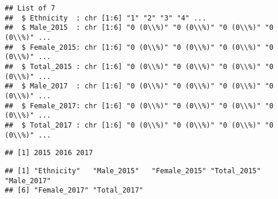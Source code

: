 \documentclass[
]{article}
\begin{document}
\begin{verbatim}
## List of 7
##  $ Ethnicity  : chr [1:6] "1" "2" "3" "4" ...
##  $ Male_2015  : chr [1:6] "0 (0\\%)" "0 (0\\%)" "0 (0\\%)" "0 (0\\%)" ...
##  $ Female_2015: chr [1:6] "0 (0\\%)" "0 (0\\%)" "0 (0\\%)" "0 (0\\%)" ...
##  $ Total_2015 : chr [1:6] "0 (0\\%)" "0 (0\\%)" "0 (0\\%)" "0 (0\\%)" ...
##  $ Male_2017  : chr [1:6] "0 (0\\%)" "0 (0\\%)" "0 (0\\%)" "0 (0\\%)" ...
##  $ Female_2017: chr [1:6] "0 (0\\%)" "0 (0\\%)" "0 (0\\%)" "0 (0\\%)" ...
##  $ Total_2017 : chr [1:6] "0 (0\\%)" "0 (0\\%)" "0 (0\\%)" "0 (0\\%)" ...
\end{verbatim}

\begin{verbatim}
## [1] 2015 2016 2017
\end{verbatim}

\begin{verbatim}
## [1] "Ethnicity"   "Male_2015"   "Female_2015" "Total_2015"  "Male_2017"  
## [6] "Female_2017" "Total_2017"
\end{verbatim}
\end{document}

